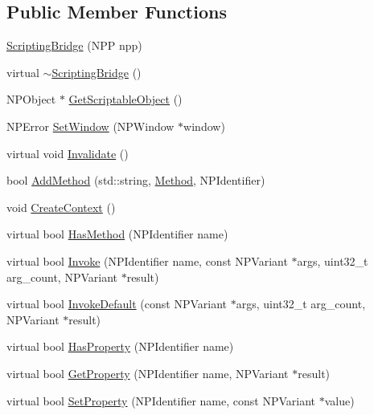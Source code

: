 \subsection*{Public Member Functions}
\begin{DoxyCompactItemize}
\item 
\hyperlink{classbridge_1_1_scripting_bridge_a9f6cceea3738d76e33f47ba8ad5f72d9}{ScriptingBridge} (NPP npp)
\item 
virtual \hyperlink{classbridge_1_1_scripting_bridge_ae6c311b5f9ffa0a578c7d8e41fa9c23c}{$\sim$ScriptingBridge} ()
\item 
NPObject $\ast$ \hyperlink{classbridge_1_1_scripting_bridge_aab70aec1714cf92f28dca4afb87ad3b4}{GetScriptableObject} ()
\item 
NPError \hyperlink{classbridge_1_1_scripting_bridge_a6b2481696ae8caa5b322e7011c0228e0}{SetWindow} (NPWindow $\ast$window)
\item 
virtual void \hyperlink{classbridge_1_1_scripting_bridge_af00ea5a26438b33f976734a3432dfa9b}{Invalidate} ()
\item 
bool \hyperlink{classbridge_1_1_scripting_bridge_aa5f733424325e07c884397e3f301f01c}{AddMethod} (std::string, \hyperlink{classbridge_1_1_scripting_bridge_aa2d60d52b4e91aa7659850b73f393727}{Method}, NPIdentifier)
\item 
void \hyperlink{classbridge_1_1_scripting_bridge_a1ebec17acf6dfcd03462eee8fec9406e}{CreateContext} ()
\item 
virtual bool \hyperlink{classbridge_1_1_scripting_bridge_a1d614bb3696baef7c46332426ab7a0dc}{HasMethod} (NPIdentifier name)
\item 
virtual bool \hyperlink{classbridge_1_1_scripting_bridge_ad18d2af321b2cba1235876cf281295df}{Invoke} (NPIdentifier name, const NPVariant $\ast$args, uint32\_\-t arg\_\-count, NPVariant $\ast$result)
\item 
virtual bool \hyperlink{classbridge_1_1_scripting_bridge_a2cee828951db15b4cce1074e934c4f97}{InvokeDefault} (const NPVariant $\ast$args, uint32\_\-t arg\_\-count, NPVariant $\ast$result)
\item 
virtual bool \hyperlink{classbridge_1_1_scripting_bridge_aeed261c756896802f26632acfceba1d7}{HasProperty} (NPIdentifier name)
\item 
virtual bool \hyperlink{classbridge_1_1_scripting_bridge_afef889fc2ff5ccabefb713cf7ad5e056}{GetProperty} (NPIdentifier name, NPVariant $\ast$result)
\item 
virtual bool \hyperlink{classbridge_1_1_scripting_bridge_ae73ff0ec0f70dfcd0e22534c8281f3e3}{SetProperty} (NPIdentifier name, const NPVariant $\ast$value)

\end{DoxyCompactItemize}

